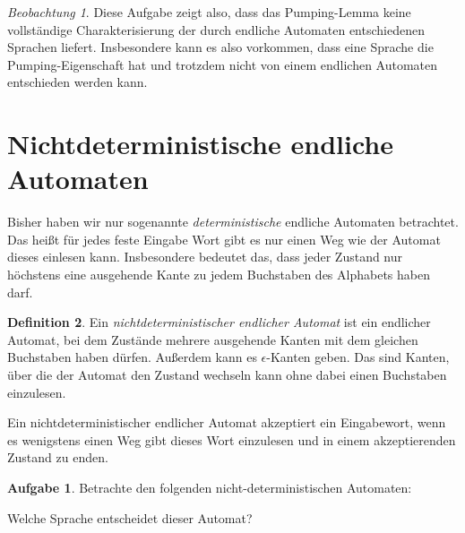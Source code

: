 \documentclass[a4paper,ngerman,12pt]{scrartcl}
\theoremstyle{definition}
\newtheorem{defn}{Definition}[]
\newtheorem{aufg}{Aufgabe}
\theoremstyle{plain}
\theoremstyle{remark}
\newtheorem{beob}[defn]{Beobachtung}
\begin{document}
\begin{beob}
	Diese Aufgabe zeigt also, dass das Pumping-Lemma keine vollständige Charakterisierung der durch endliche Automaten entschiedenen Sprachen liefert. Insbesondere kann es also vorkommen, dass eine Sprache die Pumping-Eigenschaft hat und trotzdem nicht von einem endlichen Automaten entschieden werden kann.
\end{beob}

\section{Nichtdeterministische endliche Automaten}

Bisher haben wir nur sogenannte \emph{deterministische} endliche Automaten betrachtet. Das heißt für jedes feste Eingabe Wort gibt es nur einen Weg wie der Automat dieses einlesen kann. Insbesondere bedeutet das, dass jeder Zustand nur höchstens eine ausgehende Kante zu jedem Buchstaben des Alphabets haben darf.

\begin{defn}
	Ein \emph{nichtdeterministischer endlicher Automat} ist ein endlicher Automat, bei dem Zustände mehrere ausgehende Kanten mit dem gleichen Buchstaben haben dürfen. Außerdem kann es $\epsilon$-Kanten geben. Das sind Kanten, über die der Automat den Zustand wechseln kann ohne dabei einen Buchstaben einzulesen.
	
	Ein nichtdeterministischer endlicher Automat akzeptiert ein Eingabewort, wenn es wenigstens einen Weg gibt dieses Wort einzulesen und in einem akzeptierenden Zustand zu enden.
\end{defn}

\begin{aufg}
	Betrachte den folgenden nicht-deterministischen Automaten:
	\begin{center}
	\end{center}
	Welche Sprache entscheidet dieser Automat?
\end{aufg}
\end{document}

